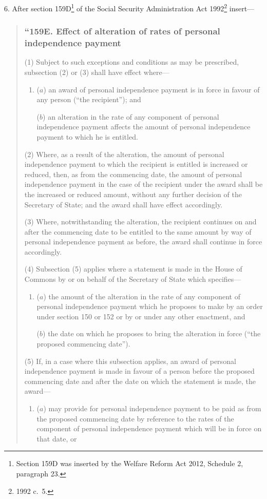 \documentclass[12pt,a4paper]{article}
\begin{document}
6.  After section 159D\footnote{Section 159D was inserted by the Welfare Reform Act 2012, Schedule 2, paragraph 23.} of the Social Security Administration Act 1992\footnote{1992 c.~5.} insert—
\begin{quotation}
\subsubsection*{“159E.  Effect of alteration of rates of personal independence payment}

(1) Subject to such exceptions and conditions as may be prescribed, subsection (2) or (3) shall have effect where—
\begin{enumerate}\item[]
($a$) an award of personal independence payment is in force in favour of any person (“the recipient”); and

($b$) an alteration in the rate of any component of personal independence payment affects the amount of personal independence payment to which he is entitled.
\end{enumerate}

(2) Where, as a result of the alteration, the amount of personal independence payment to which the recipient is entitled is increased or reduced, then, as from the commencing date, the amount of personal independence payment in the case of the recipient under the award shall be the increased or reduced amount, without any further decision of the Secretary of State; and the award shall have effect accordingly.

(3) Where, notwithstanding the alteration, the recipient continues on and after the commencing date to be entitled to the same amount by way of personal independence payment as before, the award shall continue in force accordingly.

(4) Subsection (5) applies where a statement is made in the House of Commons by or on behalf of the Secretary of State which specifies—
\begin{enumerate}\item[]
($a$) the amount of the alteration in the rate of any component of personal independence payment which he proposes to make by an order under section 150 or 152 or by or under any other enactment, and

($b$) the date on which he proposes to bring the alteration in force (“the proposed commencing date”).
\end{enumerate}

(5) If, in a case where this subsection applies, an award of personal independence payment is made in favour of a person before the proposed commencing date and after the date on which the statement is made, the award—
\begin{enumerate}\item[]
($a$) may provide for personal independence payment to be paid as from the proposed commencing date by reference to the rates of the component of personal independence payment which will be in force on that date, or


\end{enumerate}
\end{quotation}
\end{document}

